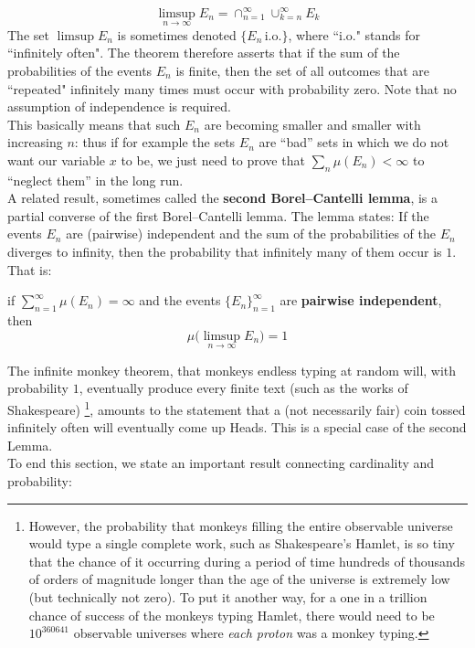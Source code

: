 \begin{equation*}
    \limsup_{n \rightarrow \infty} E_n = \cap_{n=1}^\infty \cup_{k=n}^\infty E_k
\end{equation*}
The set $\limsup E_n$ is sometimes denoted $\{E_n \, \text{i.o.} \}$, where ``i.o." stands for ``infinitely often". The theorem therefore asserts that if the sum of the probabilities of the events $E_n$ is finite, then the set of all outcomes that are ``repeated" infinitely many times must occur with probability zero. Note that no assumption of independence is required.
\\This basically means that such $E_n$ are becoming smaller and smaller with increasing $n$: thus if for example the sets $E_n$ are ``bad'' sets in which we do not want our variable $x$ to be, we just need to prove that $\sum_n \mu(E_n) < \infty$ to ``neglect them'' in the long run. 
\\A related result, sometimes called the \textbf{second Borel–Cantelli lemma}, is a partial converse of the first Borel–Cantelli lemma. The lemma states: If the events $E_n$ are (pairwise) independent and the sum of the probabilities of the $E_n$ diverges to infinity, then the probability that infinitely many of them occur is $1$. That is:
\begin{lemma}
    if $\sum_{n=1}^\infty \mu(E_n) = \infty$ and the events $\{ E_n \}_{n=1}^\infty$ are \textbf{pairwise independent}, then 
    \begin{equation*}
        \mu \big( \limsup_{n \rightarrow \infty} E_n \big) = 1
    \end{equation*}
\end{lemma}
The infinite monkey theorem, that monkeys endless typing at random will, with probability $1$, eventually produce every finite text (such as the works of Shakespeare) \footnote{However, the probability that monkeys filling the entire observable universe would type a single complete work, such as Shakespeare's Hamlet, is so tiny that the chance of it occurring during a period of time hundreds of thousands of orders of magnitude longer than the age of the universe is extremely low (but technically not zero). To put it another way, for a one in a trillion chance of success of the monkeys typing Hamlet, there would need to be $10^{360641}$ observable universes where \textit{each proton} was a monkey typing.}, amounts to the statement that a (not necessarily fair) coin tossed infinitely often will eventually come up Heads. This is a special case of the second Lemma.
\\To end this section, we state an important result connecting cardinality and probability:
